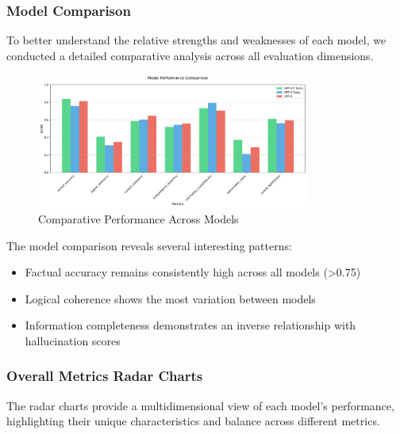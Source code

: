 \subsubsection{Model Comparison}
To better understand the relative strengths and weaknesses of each model, we conducted a detailed comparative analysis across all evaluation dimensions.

\begin{figure}[!htbp]
\centering
\includegraphics[width=0.8\textwidth]{figures/overall/model_comparison.png}
\caption{Comparative Performance Across Models}
\label{fig:model_comparison}
\end{figure}

The model comparison reveals several interesting patterns:
\begin{itemize}
    \item Factual accuracy remains consistently high across all models (>0.75)
    \item Logical coherence shows the most variation between models
    \item Information completeness demonstrates an inverse relationship with hallucination scores
\end{itemize}

\subsubsection{Overall Metrics Radar Charts}
The radar charts provide a multidimensional view of each model's performance, highlighting their unique characteristics and balance across different metrics.


